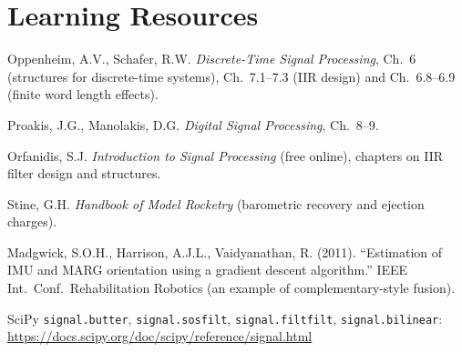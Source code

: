 \documentclass[11pt,a4paper]{article}
\begin{document}
\section*{Learning Resources}
\begin{resources}
  \item Oppenheim, A.V., Schafer, R.W. \emph{Discrete-Time Signal Processing}, Ch.~6 (structures for discrete-time systems), Ch.~7.1--7.3 (IIR design) and Ch.~6.8--6.9 (finite word length effects).
  \item Proakis, J.G., Manolakis, D.G. \emph{Digital Signal Processing}, Ch.~8--9.
  \item Orfanidis, S.J. \emph{Introduction to Signal Processing} (free online), chapters on IIR filter design and structures.
\end{resources}
\begin{resources}
  \item Stine, G.H. \emph{Handbook of Model Rocketry} (barometric recovery and ejection charges).
  \item Madgwick, S.O.H., Harrison, A.J.L., Vaidyanathan, R. (2011). ``Estimation of IMU and MARG orientation using a gradient descent algorithm.'' IEEE Int.\ Conf.\ Rehabilitation Robotics (an example of complementary-style fusion).
\end{resources}
\begin{resources}
  \item SciPy \texttt{signal.butter}, \texttt{signal.sosfilt}, \texttt{signal.filtfilt}, \texttt{signal.bilinear}: \url{https://docs.scipy.org/doc/scipy/reference/signal.html}
\end{resources}

\evaluation
\end{document}
